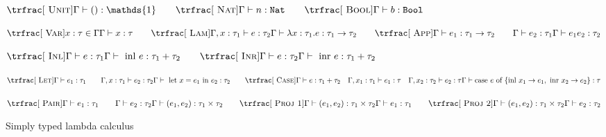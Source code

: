 \documentclass[nonacm]{acmart}
\newcommand{\nat}{\texttt{Nat}}
\newcommand{\bool}{\texttt{Bool}}
\newcommand{\caseofnobar}[3]{\text{case } #1 \text{ of } \{#2,~#3\}}
\newcommand{\inl}[1]{\text{inl } #1}
\newcommand{\inr}[1]{\text{inr } #1}
\begin{document}
\begin{figure}
  \centering
  \(
  \trfrac[~\textsc{Unit}]{}{\Gamma \vdash () : \mathds{1}}
  \qquad
  \trfrac[~\textsc{Nat}]{}{\Gamma \vdash n : \nat}
  \qquad
  \trfrac[~\textsc{Bool}]{}{\Gamma \vdash b : \bool}
  \)
  \\
  \vspace*{1em}

  \(\trfrac[~\textsc{Var}]{x : \tau \in \Gamma}{\Gamma \vdash x : \tau}
  \qquad
  \trfrac[~\textsc{Lam}]{\Gamma, x : \tau_1 \vdash e : \tau_2}{\Gamma \vdash \lambda x : \tau_1 . e : \tau_{1} \rightarrow \tau_2}
  \qquad
  \trfrac[~\textsc{App}]{\Gamma \vdash e_1 : \tau_1 \rightarrow \tau_2 \qquad \Gamma \vdash e_{2} : \tau_1}{\Gamma \vdash e_{1} e_{2} : \tau_2} \) \\
  \vspace*{1em}

  \(
  \trfrac[~\textsc{Inl}]{\Gamma \vdash e : \tau_1}{\Gamma \vdash \text{ inl } e : \tau_1 + \tau_2}
  \qquad
  \trfrac[~\textsc{Inr}]{\Gamma \vdash e : \tau_2}{\Gamma \vdash \text{ inr } e : \tau_1 + \tau_2}
  \) \\ \vspace*{1em}

  \(\trfrac[~\textsc{Let}]{\Gamma \vdash e_1 : \tau_1 \qquad \Gamma, x : \tau_1 \vdash e_2 : \tau_2}{\Gamma \vdash \text{ let } x = e_1 \text{ in } e_2 : \tau_2}
  \qquad
  \trfrac[~\textsc{Case}]{\Gamma \vdash e : \tau_1 + \tau_2 \quad \Gamma, x_1 : \tau_1 \vdash e_1 : \tau \quad \Gamma, x_2 : \tau_2 \vdash e_2 : \tau}{\Gamma \vdash \caseofnobar{e}{\inl{x_1} \rightarrow e_1}{\inr{x_2} \rightarrow e_2} : \tau}
  \) \\ \vspace*{1em}

  \(\trfrac[~\textsc{Pair}]{\Gamma \vdash e_1 : \tau_1 \qquad \Gamma \vdash e_2 : \tau_2}{\Gamma \vdash (e_1, e_2) : \tau_1 \times \tau_2}
  \qquad
  \trfrac[~\textsc{Proj 1}]{\Gamma \vdash (e_{1}, e_{2}) : \tau_{1} \times \tau_{2}}{\Gamma \vdash e_1 : \tau_{1}}
  \qquad
  \trfrac[~\textsc{Proj 2}]{\Gamma \vdash (e_{1}, e_{2}) : \tau_{1} \times \tau_{2}}{\Gamma \vdash e_2 : \tau_{2}} \)

  \caption{Simply typed lambda calculus}\label{fig:stlc}
\end{figure}

\end{document}

